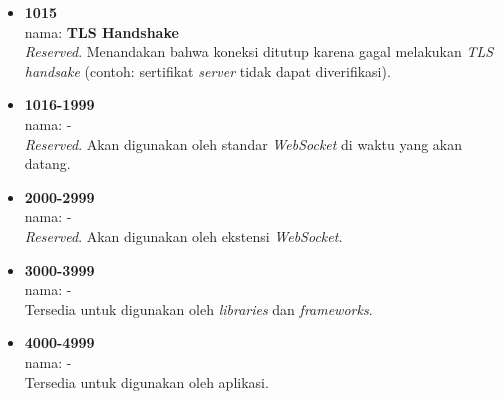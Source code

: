 \documentclass[a4paper,twoside]{article}
\begin{document}
\begin{enumerate}
\begin{enumerate}
\begin{itemize}
				\item \textbf{1015} \\ nama: \textbf{TLS Handshake} \\ \textit{Reserved}. Menandakan bahwa koneksi ditutup karena gagal melakukan \textit{TLS handsake} (contoh: sertifikat \textit{server} tidak dapat diverifikasi).
				
				\item \textbf{1016-1999} \\ nama: - \\ \textit{Reserved}. Akan digunakan oleh standar \textit{WebSocket} di waktu yang akan datang.
				
				\item \textbf{2000-2999} \\ nama: - \\ \textit{Reserved}. Akan digunakan oleh ekstensi \textit{WebSocket}.
				
				\item \textbf{3000-3999} \\ nama: - \\ Tersedia untuk digunakan oleh \textit{libraries} dan \textit{frameworks}.
				
				\item \textbf{4000-4999} \\ nama: - \\ Tersedia untuk digunakan oleh aplikasi.
			\end{itemize}
			

\end{enumerate}
\end{enumerate}
\end{document}
